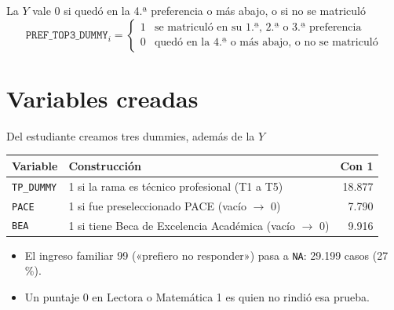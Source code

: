 \begin{frame}{La $Y$ vale 0 si quedó en la 4.ª preferencia o más abajo, o si no se matriculó}
  \[
  \texttt{PREF\_TOP3\_DUMMY}_i =
  \begin{cases}
    1 & \text{se matriculó en su 1.ª, 2.ª o 3.ª preferencia} \\[2pt]
    0 & \text{quedó en la 4.ª o más abajo, o no se matriculó}
  \end{cases}
  \]
  \begin{center}
  \end{center}
\end{frame}

\section{Variables creadas}

\begin{frame}{Del estudiante creamos tres dummies, además de la $Y$}
  \begin{center}
  \begin{tabular}{llr}
    \toprule
    \textbf{Variable} & \textbf{Construcción} & \textbf{Con 1} \\
    \midrule
    \texttt{TP\_DUMMY} & 1 si la rama es técnico profesional (T1 a T5) & 18.877 \\
    \texttt{PACE} & 1 si fue preseleccionado PACE (vacío $\to$ 0) & 7.790 \\
    \texttt{BEA} & 1 si tiene Beca de Excelencia Académica (vacío $\to$ 0) & 9.916 \\
    \bottomrule
  \end{tabular}
  \end{center}
  \medskip
  \begin{itemize}[itemsep=4pt]
    \item El ingreso familiar 99 («prefiero no responder») pasa a \texttt{NA}:
          29.199 casos (27\,\%).
    \item Un puntaje 0 en Lectora o Matemática 1 es quien no rindió esa prueba.
  \end{itemize}
\end{frame}

